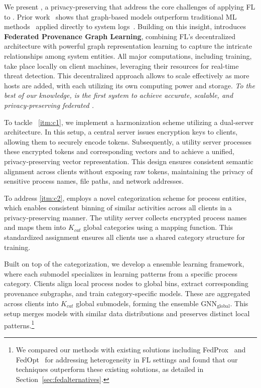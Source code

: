 \smallskip
{}
\smallskip

\noindent
We present \Sys, a privacy-preserving \pids that address the core challenges of applying FL to \pids. Prior work~\cite{wang2022threatrace} shows that graph-based models outperform traditional ML methods~\cite{chowdhary2020natural, goodfellow2020generative} applied directly to system logs~\cite{deeplog2017, xia2019loggan}. Building on this insight, \Sys introduces {\bf Federated Provenance Graph Learning}, combining FL’s decentralized architecture with powerful graph representation learning to capture the intricate relationships among system entities. All major computations, including training, take place locally on client machines, leveraging their resources for real-time threat detection. This decentralized approach allows \Sys to scale effectively as more hosts are added, with each utilizing its own computing power and storage.  {\it To the best of our knowledge, \Sys is the first system to achieve accurate, scalable, and privacy-preserving federated \pids.}

 To tackle ~\ref{itm:c1}, we implement a \wordvec harmonization scheme utilizing a dual-server architecture. In this setup, a central server issues encryption keys to clients, allowing them to securely encode \wordvec tokens. Subsequently, a utility server processes these encrypted tokens and corresponding vectors and to achieve a unified, privacy-preserving vector representation. This design ensures consistent semantic alignment across clients without exposing raw tokens, maintaining the privacy of sensitive process names, file paths, and network addresses.

To address \ref{itm:c2}, \Sys employs a novel categorization scheme for process entities, which enables consistent binning of similar activities across all clients in a privacy-preserving manner. The utility server collects encrypted process names and maps them into
 \( K_{cat} \) global categories using a mapping function. This standardized assignment ensures all clients use a shared category structure for training.

 Built on top of the categorization, we develop a \gnnshort ensemble learning framework, where each submodel specializes in learning patterns from a specific process category. Clients align local process nodes to global bins, extract corresponding provenance subgraphs, and train category-specific models. These are aggregated across clients into \( K_{cat} \) global submodels, forming the ensemble \( \text{GNN}_{\text{global}} \). This setup merges models with similar data distributions and preserves distinct local patterns.\footnote{We compared our methods with existing solutions including FedProx~\cite{li2020federated} and FedOpt~\cite{asad2020fedopt} for addressing heterogeneity in FL settings and found that our techniques outperform these existing solutions, as detailed in Section~\ref{sec:fedalternatives}.}

